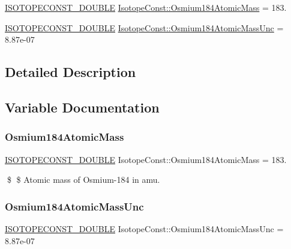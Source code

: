 \begin{DoxyCompactItemize}
\item 
\mbox{\hyperlink{group___isotope_const-_macros_ga8f45a7272ce02c0b4c65c44636ed719a}{I\+S\+O\+T\+O\+P\+E\+C\+O\+N\+S\+T\+\_\+\+D\+O\+U\+B\+LE}} \mbox{\hyperlink{group___isotope_const-_osmium-_os184_ga7385e33b5d5772ed13664bb83cc1aa56}{Isotope\+Const\+::\+Osmium184\+Atomic\+Mass}} = 183.
\item 
\mbox{\hyperlink{group___isotope_const-_macros_ga8f45a7272ce02c0b4c65c44636ed719a}{I\+S\+O\+T\+O\+P\+E\+C\+O\+N\+S\+T\+\_\+\+D\+O\+U\+B\+LE}} \mbox{\hyperlink{group___isotope_const-_osmium-_os184_ga126aec34abe4ac353025e432afe2538d}{Isotope\+Const\+::\+Osmium184\+Atomic\+Mass\+Unc}} = 8.\+87e-\/07
\end{DoxyCompactItemize}


\subsection{Detailed Description}


\subsection{Variable Documentation}
\mbox{\label{group___isotope_const-_osmium-_os184_ga7385e33b5d5772ed13664bb83cc1aa56}} 
\subsubsection{\texorpdfstring{Osmium184\+Atomic\+Mass}{Osmium184AtomicMass}}
{\footnotesize\ttfamily \mbox{\hyperlink{group___isotope_const-_macros_ga8f45a7272ce02c0b4c65c44636ed719a}{I\+S\+O\+T\+O\+P\+E\+C\+O\+N\+S\+T\+\_\+\+D\+O\+U\+B\+LE}} Isotope\+Const\+::\+Osmium184\+Atomic\+Mass = 183.}

\$ \$ Atomic mass of Osmium-\/184 in amu. \mbox{\label{group___isotope_const-_osmium-_os184_ga126aec34abe4ac353025e432afe2538d}} 
\subsubsection{\texorpdfstring{Osmium184\+Atomic\+Mass\+Unc}{Osmium184AtomicMassUnc}}
{\footnotesize\ttfamily \mbox{\hyperlink{group___isotope_const-_macros_ga8f45a7272ce02c0b4c65c44636ed719a}{I\+S\+O\+T\+O\+P\+E\+C\+O\+N\+S\+T\+\_\+\+D\+O\+U\+B\+LE}} Isotope\+Const\+::\+Osmium184\+Atomic\+Mass\+Unc = 8.\+87e-\/07}

